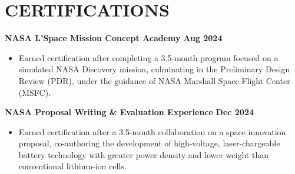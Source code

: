 \documentclass[letterpaper,11pt]{article}
\begin{document}
\section{CERTIFICATIONS}
\textbf{NASA L’Space Mission Concept Academy} \hfill \textbf{Aug 2024}
\begin{itemize}
    \item Earned certification after completing a 3.5-month program focused on a simulated NASA Discovery mission, culminating in the Preliminary Design Review (PDR), under the guidance of NASA Marshall Space Flight Center (MSFC).
\end{itemize}
\textbf{NASA Proposal Writing \& Evaluation Experience} \hfill \textbf{Dec 2024}
\begin{itemize}
    \item Earned certification after a 3.5-month collaboration on a space innovation proposal, co-authoring the development of high-voltage, laser-chargeable battery technology with greater power density and lower weight than conventional lithium-ion cells.
\end{itemize}
\end{document}
